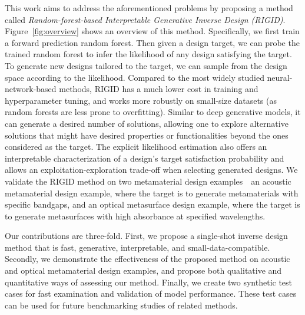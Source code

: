 \documentclass{article}
\begin{document}
This work aims to address the aforementioned problems by proposing a method called \textit{Random-forest-based Interpretable Generative Inverse Design (RIGID)}. 
Figure~\ref{fig:overview} shows an overview of this method. Specifically, we first train a forward prediction random forest. Then given a design target, we can probe the trained random forest to infer the likelihood of any design satisfying the target. To generate new designs tailored to the target, we can sample from the design space according to the likelihood. Compared to the most widely studied neural-network-based methods, RIGID has a much lower cost in training and hyperparameter tuning, and works more robustly on small-size datasets (as random forests are less prone to overfitting). Similar to deep generative models, it can generate a desired number of solutions, allowing one to explore alternative solutions that might have desired properties or functionalities beyond the ones considered as the target. The explicit likelihood estimation also offers an interpretable characterization of a design's target satisfaction probability and allows an exploitation-exploration trade-off when selecting generated designs. We validate the RIGID method on two metamaterial design examples~\textemdash~an acoustic metamaterial design example, where the target is to generate metamaterials with specific bandgaps, and an optical metasurface design example, where the target is to generate metasurfaces with high absorbance at specified wavelengths.

Our contributions are three-fold. First, we propose a single-shot inverse design method that is fast, generative, interpretable, and small-data-compatible. Secondly, we demonstrate the effectiveness of the proposed method on acoustic and optical metamaterial design examples, and propose both qualitative and quantitative ways of assessing our method. Finally, we create two synthetic test cases for fast examination and validation of model performance. These test cases can be used for future benchmarking studies of related methods.



\end{document}
